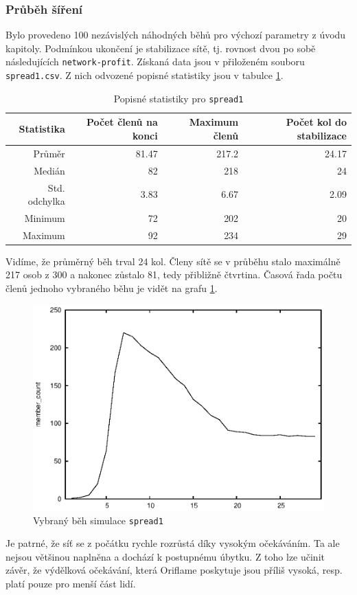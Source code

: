 \documentclass[a4wide,12pt]{report}
\begin{document}
\subsubsection{Průběh šíření}
Bylo provedeno 100 nezávislých náhodných běhů pro výchozí parametry z úvodu kapitoly. Podmínkou ukončení je stabilizace sítě, tj. rovnost dvou po sobě následujících \texttt{network-profit}. Získaná data jsou v přiloženém souboru \texttt{spread1.csv}. Z nich odvozené popisné statistiky jsou v tabulce \ref{tab:spread1_desc}.
\begin{table}[h]
  \begin{center}
  \begin{tabular}{|r|r|r|r|}
  \hline
  Statistika&Počet členů na konci	&Maximum členů	&Počet kol do stabilizace\\\hline
  Průměr	&81.47	&217.2	&24.17\\
  Medián	&82	&218	&24\\
  Std. odchylka	&3.83	&6.67	&2.09\\
  Minimum	&72	&202	&20\\
  Maximum	&92	&234	&29\\\hline
  \end{tabular}
  \end{center}
  \caption{Popisné statistiky pro \texttt{spread1}}
  \label{tab:spread1_desc}
\end{table}
Vidíme, že průměrný běh trval 24 kol. Členy sítě se v průběhu stalo maximálně 217 osob z 300 a nakonec zůstalo 81, tedy přibližně čtvrtina. Časová řada počtu členů jednoho vybraného běhu je vidět na grafu \ref{fig:spread1_run}.
\begin{figure}[h]
  \centering
  \includegraphics{member_count.eps}
  \caption{Vybraný běh simulace \texttt{spread1}}
  \label{fig:spread1_run}
\end{figure}
Je patrné, že síť se z počátku rychle rozrůstá díky vysokým očekáváním. Ta ale nejsou většinou naplněna a dochází k postupnému úbytku. Z toho lze učinit závěr, že výdělková očekávání, která Oriflame poskytuje jsou příliš vysoká, resp. platí pouze pro menší část lidí.
\end{document}
